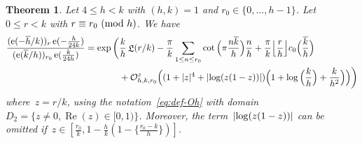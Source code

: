 \documentclass[11pt]{amsart}
\renewcommand{\mod}[1]{~\pr{\textnormal{mod}~#1}}
\newtheorem{theorem}[theo]{Theorem}
\theoremstyle{definition}
\newcommand{\ssum}[1]{\sum_{\substack{#1}}}
\newcommand{\pr}[1]{\mathchoice{\left( #1\right)}{(#1)}{(#1)}{(#1)}}
\newcommand{\floor}[1]{{\left\lfloor {#1} \right\rfloor}}
\newcommand{\e}[1][]{\ifthenelse{\equal{#1}{}}{{\rm e}}{\operatorname{e}\pr{ #1}}}
\newcommand{\Oh}{\mathcal{O}}
\DeclareMathOperator{\Lie}{{\mathfrak L}}
\renewcommand\Re{\operatorname{Re}}
\newcommand{\1}{{\mathbf 1}}
\newcommand{\abs}[1]{\left|#1\right|}
\let\originalleft\left
\let\originalright\right
\renewcommand{\left}{\mathopen{}\mathclose\bgroup\originalleft}
\renewcommand{\right}{\aftergroup\egroup\originalright}
\numberwithin{equation}{section}
\begin{document}
\begin{theorem}\label{thp}
  Let $4\leq h< k$ with $(h,k)=1$ and $r_0\in \{0, \dotsc, h-1\}$. Let~$0\leq r<k$ with $r\equiv r_0\mod{h}$.
  We have 
  \begin{align*}
    \frac{(\e[-{\overline h}/k])_{r}\e[-\frac{h}{24k}]}{(\e[{\overline k}/h])_{r_0}\e[\frac{k}{24h}]}=\exp\bigg(&\frac{k}h\Lie(r/k) -\frac{\pi }k\ssum{1\leq n\leq r_0}\cot\Big(\pi\frac{n\overline k }h\Big)\frac{ n}{h}+\frac {\pi}k\floor{\frac rh}c_0\Big(\frac{\overline k}h\Big) \\
    {}& + \Oh_{h,k,r_0}^{z}\Big((1+|z|^4+\abs{\log(z(1-z))})\Big(1+\log\Big(\frac kh\Big)+\frac k{h^{2}}\Big)\Big)\bigg)
  \end{align*}
  where~$z=r/k$, using the notation~\eqref{eq:def-Oh} with domain~$D_2 = \{z\neq 0, \Re(z)\in[0, 1)\}$. Moreover, the term~$\abs{\log(z(1-z))}$ can be omitted if~$z\in[\frac{r_0}k, 1-\frac{h}k(1-\{\frac{r_0-k}{h}\})]$.
\end{theorem}
\end{document}
